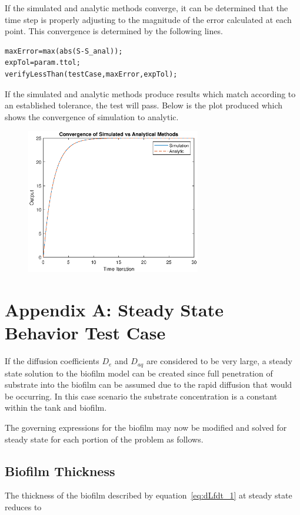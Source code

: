 \documentclass[letterpaper, twoside]{article}
\numberwithin{equation}{section}
\begin{document}
If the simulated and analytic methods converge, it can be determined that the time step is properly adjusting to the magnitude of the error calculated at each point. This convergence is determined by the following lines.

\begin{lstlisting}
maxError=max(abs(S-S_anal));
expTol=param.ttol;
verifyLessThan(testCase,maxError,expTol);
\end{lstlisting}

If the simulated and analytic methods produce results which match according to an established tolerance, the test will pass. Below is the plot produced which shows the convergence of simulation to analytic.

\begin{figure}[H]
  \centering
  \includegraphics[read=eps, width=3in]{TimeDynamics_Figure.eps}
\end{figure}

\section{Appendix A: Steady State Behavior Test Case}\label{Steady State}

If the diffusion coefficients $D_e$ and $D_{aq}$ are considered to be very large, a steady state solution to the biofilm model can be created since full penetration of substrate into the biofilm can be assumed due to the rapid diffusion that would be occurring. In this case scenario the substrate concentration is a constant within the tank and biofilm.

The governing expressions for the biofilm may now be modified and solved for steady state for each portion of the problem as follows.

\subsection{Biofilm Thickness}
The thickness of the biofilm described by equation~\ref{eq:dLfdt_1} at steady state reduces to 
\end{document}
